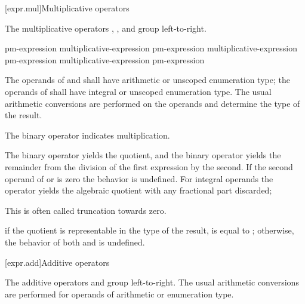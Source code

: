 [expr.mul]{Multiplicative operators}%
%

\pnum
The multiplicative operators \tcode{*}, \tcode{/}, and \tcode{\%} group
left-to-right.

%
%
%
%
%
%
%
%
\begin{bnf}
\br
    pm-expression\br
    multiplicative-expression \terminal{*} pm-expression\br
    multiplicative-expression \terminal{/} pm-expression\br
    multiplicative-expression \terminal{\%} pm-expression
\end{bnf}

\pnum
The operands of \tcode{*} and \tcode{/} shall have arithmetic or unscoped
enumeration type; the operands of \tcode{\%} shall have integral or unscoped
enumeration type. The usual arithmetic conversions are performed on the
operands and determine the type of the result.

\pnum
The binary \tcode{*} operator indicates multiplication.

\pnum
The binary \tcode{/} operator yields the quotient, and the binary
\tcode{\%} operator yields the remainder from the division of the first
expression by the second.
%
If the second operand of \tcode{/} or \tcode{\%} is zero the behavior is
undefined.
For integral operands the \tcode{/} operator yields the algebraic quotient with
any fractional part discarded;
\begin{footnote}
This is often called truncation towards zero.
\end{footnote}
if the quotient  is representable in the type of the result,
 is equal to ; otherwise, the behavior
of both  and  is undefined.

[expr.add]{Additive operators}%
%

\pnum
The additive operators \tcode{+} and \tcode{-} group left-to-right. The
usual arithmetic conversions are performed for operands of arithmetic or
enumeration type.

